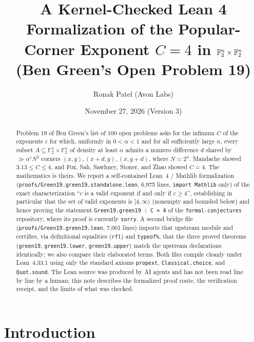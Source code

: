 \documentclass[11pt,reqno]{amsart}
\title[Kernel-Checked Lean 4 Formalization of Green's Problem 19]{A Kernel-Checked Lean 4 Formalization of the Popular-Corner Exponent $C = 4$ in $\F_2^n \times \F_2^n$ (Ben Green's Open Problem 19)}
\author{Ronak Patel (Avon Labs)}
\date{November 27, 2026 (Version 3)}
\theoremstyle{remark}
\newcommand{\F}{\mathbb{F}}
\newcommand{\LeanUS}{\textunderscore\hspace{0pt}}
\newcommand{\lean}[1]{{\let\_\LeanUS\texttt{#1}}}
\begin{document}
\begin{abstract}
Problem 19 of Ben Green's list of 100 open problems asks for the infimum $C$ of the exponents $c$ for which, uniformly in $0 < \alpha < 1$ and for all sufficiently large $n$, every subset $A \subseteq \F_2^n \times \F_2^n$ of density at least $\alpha$ admits a nonzero difference $d$ shared by $\gg \alpha^c N^2$ corners $(x, y), (x + d, y), (x, y + d)$, where $N = 2^n$. Mandache showed $3.13 \le C \le 4$, and Fox, Sah, Sawhney, Stoner, and Zhao showed $C = 4$. The mathematics is theirs. We report a self-contained Lean~4 / Mathlib formalization (\lean{proofs/\allowbreak{}Green19.\allowbreak{}green\_19.\allowbreak{}standalone.\allowbreak{}lean}, 6,975 lines, \lean{import Mathlib} only) of the exact characterization ``$c$ is a valid exponent if and only if $c \ge 4$'', establishing in particular that the set of valid exponents is $[4, \infty)$ (nonempty and bounded below) and hence proving the statement \lean{Green19.\allowbreak{}green\_19 : C = 4} of the \lean{formal-conjectures} repository, where its proof is currently \lean{sorry}. A second bridge file (\lean{proofs/\allowbreak{}Green19.\allowbreak{}green\_19.\allowbreak{}lean}, 7,001 lines) imports that upstream module and certifies, via definitional equalities (\lean{rfl}) and \lean{type\_of\%}, that the three proved theorems (\lean{green\_19}, \lean{green\_19.\allowbreak{}lower}, \lean{green\_19.\allowbreak{}upper}) match the upstream declarations identically; we also compare their elaborated terms. Both files compile cleanly under Lean~4.33.1 using only the standard axioms \lean{propext}, \lean{Classical.\allowbreak{}choice}, and \lean{Quot.\allowbreak{}sound}. The Lean source was produced by AI agents and has not been read line by line by a human; this note describes the formalized proof route, the verification receipt, and the limits of what was checked.
\end{abstract}

\maketitle

\section{Introduction}\label{sec:intro}
\end{document}
